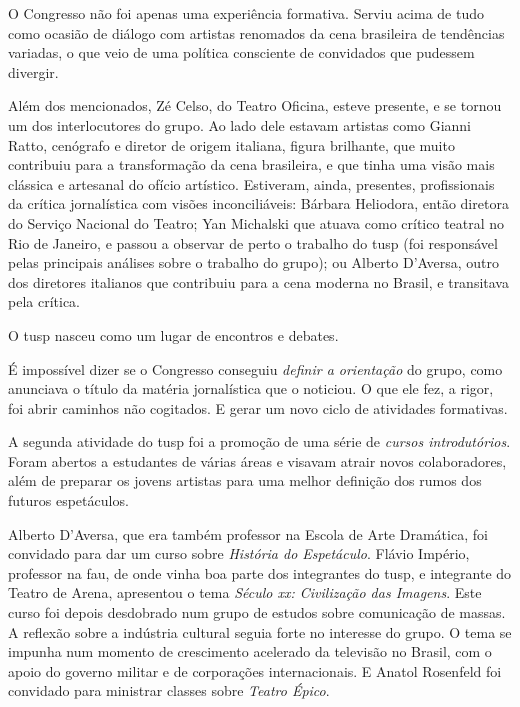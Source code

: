 O Congresso não foi apenas uma experiência formativa. Serviu acima de
tudo como ocasião de diálogo com artistas renomados da cena brasileira
de tendências variadas, o que veio de uma política consciente de
convidados que pudessem divergir.

Além dos mencionados, Zé Celso, do Teatro Oficina, esteve presente, e se
tornou um dos interlocutores do grupo. Ao lado dele estavam artistas
como Gianni Ratto, cenógrafo e diretor de origem italiana, figura
brilhante, que muito contribuiu para a transformação da cena brasileira,
e que tinha uma visão mais clássica e artesanal do ofício artístico.
Estiveram, ainda, presentes, profissionais da crítica jornalística com
visões inconciliáveis: Bárbara Heliodora, então diretora do Serviço
Nacional do Teatro; Yan Michalski que atuava como crítico teatral no Rio
de Janeiro, e passou a observar de perto o trabalho do {\sc tusp} (foi
responsável pelas principais análises sobre o trabalho do grupo); ou
Alberto D'Aversa, outro dos diretores italianos que contribuiu para a
cena moderna no Brasil, e transitava pela crítica.

O {\sc tusp} nasceu como um lugar de encontros e debates.

\subject{Avaliação dos encontros e escolha dos novos estudos}

É impossível dizer se o Congresso conseguiu {\it definir a orientação}
do grupo, como anunciava o título da matéria jornalística que o
noticiou. O que ele fez, a rigor, foi abrir caminhos não cogitados. E
gerar um novo ciclo de atividades formativas.

A segunda atividade do {\sc tusp} foi a promoção de uma série de {\it cursos
introdutórios}. Foram abertos a estudantes de várias áreas e visavam
atrair novos colaboradores, além de preparar os jovens artistas para uma
melhor definição dos rumos dos futuros espetáculos.

Alberto D'Aversa, que era também professor na Escola de Arte Dramática,
foi convidado para dar um curso sobre {\it História do Espetáculo}.
Flávio Império, professor na {\sc fau}, de onde vinha boa parte dos
integrantes do {\sc tusp}, e integrante do Teatro de Arena, apresentou o tema
{\it Século {\sc xx}: Civilização das Imagens}. Este curso foi depois
desdobrado num grupo de estudos sobre comunicação de massas. A reflexão
sobre a indústria cultural seguia forte no interesse do grupo. O tema se
impunha num momento de crescimento acelerado da televisão no Brasil, com
o apoio do governo militar e de corporações internacionais. E Anatol
Rosenfeld foi convidado para ministrar classes sobre {\it Teatro Épico}.

